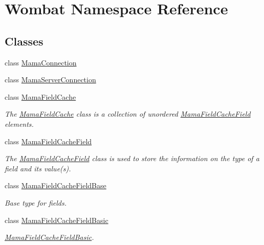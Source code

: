 \hypertarget{namespaceWombat}{
\section{Wombat Namespace Reference}
\label{namespaceWombat}
}
\subsection*{Classes}
\begin{DoxyCompactItemize}
\item 
class \hyperlink{classWombat_1_1MamaConnection}{MamaConnection}
\item 
class \hyperlink{classWombat_1_1MamaServerConnection}{MamaServerConnection}
\item 
class \hyperlink{classWombat_1_1MamaFieldCache}{MamaFieldCache}
\begin{DoxyCompactList}\small\item\em The {\ttfamily \hyperlink{classWombat_1_1MamaFieldCache}{MamaFieldCache}} class is a collection of unordered {\ttfamily \hyperlink{classWombat_1_1MamaFieldCacheField}{MamaFieldCacheField}} elements. \item\end{DoxyCompactList}\item 
class \hyperlink{classWombat_1_1MamaFieldCacheField}{MamaFieldCacheField}
\begin{DoxyCompactList}\small\item\em The {\ttfamily \hyperlink{classWombat_1_1MamaFieldCacheField}{MamaFieldCacheField}} class is used to store the information on the type of a field and its value(s). \item\end{DoxyCompactList}\item 
class \hyperlink{classWombat_1_1MamaFieldCacheFieldBase}{MamaFieldCacheFieldBase}
\begin{DoxyCompactList}\small\item\em Base type for fields. \item\end{DoxyCompactList}\item 
class \hyperlink{classWombat_1_1MamaFieldCacheFieldBasic}{MamaFieldCacheFieldBasic}
\begin{DoxyCompactList}\small\item\em \hyperlink{classWombat_1_1MamaFieldCacheFieldBasic}{MamaFieldCacheFieldBasic}. \item\end{DoxyCompactList}\item 

\end{DoxyCompactItemize}
